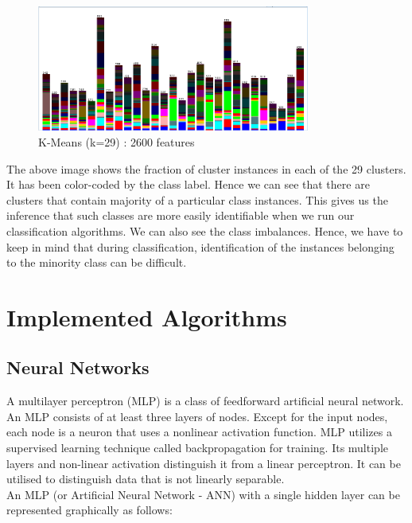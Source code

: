 \documentclass[12pt]{report}
\begin{document}
\begin{figure}[H]
  \centering
  \includegraphics[width=0.8\textwidth]{Images/cluster1.png}
  \caption{K-Means (k=29) : 2600 features}
\end{figure}

The above image shows the fraction of cluster instances in each of the 29 clusters. It has been color-coded by the class label. Hence we can see that there are clusters that contain majority of a particular class instances. This gives us the inference that such classes are more easily identifiable when we run our classification algorithms. We can also see the class imbalances. Hence, we have to keep in mind that during classification, identification of the instances belonging to the minority class can be difficult.



\newpage
\section{Implemented Algorithms}

\subsection{Neural Networks}
A multilayer perceptron (MLP) is a class of feedforward artificial neural network. An MLP consists of at least three layers of nodes. Except for the input nodes, each node is a neuron that uses a nonlinear activation function. MLP utilizes a supervised learning technique called backpropagation for training. Its multiple layers and non-linear activation distinguish it from a linear perceptron. It can be utilised to distinguish data that is not linearly separable.\\

An MLP (or Artificial Neural Network - ANN) with a single hidden layer can be represented graphically as follows:
\end{document}
